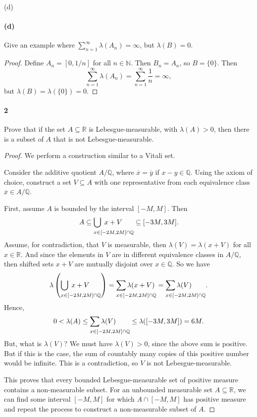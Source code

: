 \documentclass[12pt]{article}
\makeatletter
\newlength{\myparskip}
\newenvironment{fullbox}{\begin{lrbox}{\savefullbox}\begin{minipage}{\dimexpr\textwidth-2\fboxsep\relax}\setlength{\parskip}{\myparskip}}{\end{minipage}\end{lrbox}\framebox[\textwidth]{\usebox{\savefullbox}}}
\newenvironment{pbox}[1][]{\begin{fullbox}\ifx#1\empty\else\paragraph{#1}\fi}{\end{fullbox}}
\newcommand{\N}{\mathbb{N}}
\newcommand{\Q}{\mathbb{Q}}
\newcommand{\R}{\mathbb{R}}
\newcommand{\<}{\langle}
\renewcommand{\>}{\rangle}
\newcommand{\eqc}{\overline}
\newcommand{\longlimit}[2]{
    {
        \def\arraystretch{0}
        \begin{array}[t]{@{}l@{}}
            \displaystyle{#2} \\[8.5pt] \scriptstyle{#1}
        \end{array}
    }
}
\newcommand{\longsum}[2]{\longlimit{#1}{\sum #2}}
\newcommand{\longcup}[2]{\longlimit{#1}{\bigcup #2}}
\makeatother
\begin{document}
\begin{pbox}[(d)]
    Give an example where $\sum_{n=1}^{\infty} \lambda(A_n) = \infty$, but $\lambda(B) = 0$.
\end{pbox}

\begin{proof}
    Define $A_n = [0, 1/n]$ for all $n \in \N$. Then $B_n = A_n$, so $B = \{0\}$. Then
    \[
        \sum_{n=1}^{\infty} \lambda(A_n)
            = \sum_{n=1}^{\infty} \frac{1}{n}
            = \infty,
    \]
    but $\lambda(B) = \lambda(\{0\}) = 0$.
\end{proof}




\newpage
\begin{pbox}[2]
    Prove that if the set $A \subseteq \R$ is Lebesgue-measurable, with $\lambda(A) > 0$, then there is a subset of $A$ that is not Lebesgue-measurable.
\end{pbox}

\begin{proof}
    We perform a construction similar to a Vitali set.

    Consider the additive quotient $A/\Q$, where $\eqc{x} = \eqc{y}$ if $x - y \in \Q$. Using the axiom of choice, construct a set $V \subseteq A$ with one representative from each equivalence class $\eqc{x} \in A/\Q$.

    First, assume $A$ is bounded by the interval $[-M, M]$. Then
    \[
        A \subseteq \longcup{x \in [-2M, 2M] \cap \Q}{\;x + V} \subseteq [-3M, 3M].
    \]
    Assume, for contradiction, that $V$ is measurable, then $\lambda(V) = \lambda(x + V)$ for all $x \in \R$. And since the elements in $V$ are in different equivalence classes in $A/\Q$, then shifted sets $x + V$ are mutually disjoint over $x \in \Q$. So we have
    \[
        \lambda\left(\longcup{x \in [-2M, 2M] \cap \Q}{\;x + V}\right)
            = \longsum{x \in [-2M, 2M] \cap \Q}{\lambda(x + V)}
            = \longsum{x \in [-2M, 2M] \cap \Q}{\lambda(V)}.
    \]
    Hence,
    \[
        0 < \lambda(A) \leq \longsum{x \in [-2M, 2M] \cap \Q}{\lambda(V)} \leq \lambda([-3M, 3M]) = 6M.
    \]
    But, what is $\lambda(V)$? We must have $\lambda(V) > 0$, since the above sum is positive. But if this is the case, the sum of countably many copies of this positive number would be infinite. This is a contradiction, so $V$ is not Lebesgue-measurable.

    This proves that every bounded Lebesgue-measurable set of positive measure contains a non-measurable subset. For an unbounded measurable set $A \subseteq \R$, we can find some interval $[-M, M]$ for which $A \cap [-M, M]$ has positive measure and repeat the process to construct a non-measurable subset of $A$.

\end{proof}
\end{document}

